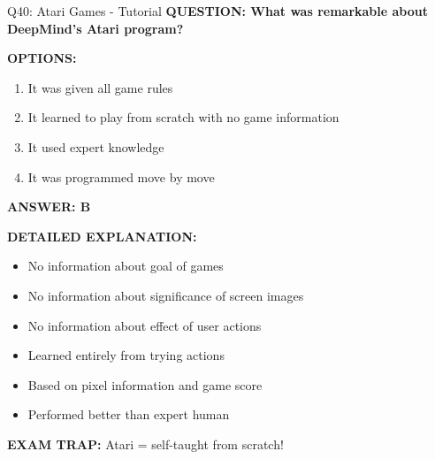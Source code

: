 \documentclass[8pt]{beamer}
\begin{document}
	\begin{frame}{Q40: Atari Games - Tutorial}
		\fontsize{6.5}{7.5}\selectfont
		\textbf{QUESTION: What was remarkable about DeepMind's Atari program?}
		
		\vspace{0.1cm}
		\textbf{OPTIONS:}
		\begin{enumerate}
			\item It was given all game rules
			\item It learned to play from scratch with no game information
			\item It used expert knowledge
			\item It was programmed move by move
		\end{enumerate}
		
		\vspace{0.1cm}
		\textcolor{myblue}{\textbf{ANSWER: B}}
		
		\vspace{0.1cm}
		\textbf{DETAILED EXPLANATION:}
		\begin{itemize}
			\item No information about goal of games
			\item No information about significance of screen images
			\item No information about effect of user actions
			\item Learned entirely from trying actions
			\item Based on pixel information and game score
			\item Performed better than expert human
		\end{itemize}
		
		\vspace{0.1cm}
		\textcolor{myred}{\textbf{EXAM TRAP:}} Atari = \textcolor{myblue}{self-taught from scratch}!
	\end{frame}
	
\end{document}
